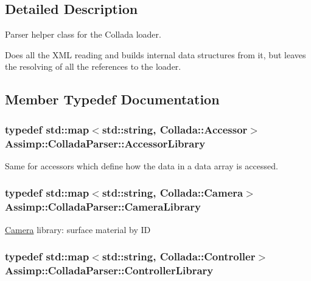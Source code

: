 \subsection{Detailed Description}
Parser helper class for the Collada loader.

Does all the X\+M\+L reading and builds internal data structures from it, but leaves the resolving of all the references to the loader. 

\subsection{Member Typedef Documentation}
\hypertarget{class_assimp_1_1_collada_parser_ae9cc736118cecbbebb1117247aa83ff7}{
\subsubsection[{Accessor\+Library}]{\setlength{\rightskip}{0pt plus 5cm}typedef std\+::map$<$std\+::string, {\bf Collada\+::\+Accessor}$>$ {\bf Assimp\+::\+Collada\+Parser\+::\+Accessor\+Library}\hspace{0.3cm}{\ttfamily [protected]}}}\label{class_assimp_1_1_collada_parser_ae9cc736118cecbbebb1117247aa83ff7}
Same for accessors which define how the data in a data array is accessed. \hypertarget{class_assimp_1_1_collada_parser_a682434e214b9d9831166f0ac55b1aed4}{
\subsubsection[{Camera\+Library}]{\setlength{\rightskip}{0pt plus 5cm}typedef std\+::map$<$std\+::string, {\bf Collada\+::\+Camera}$>$ {\bf Assimp\+::\+Collada\+Parser\+::\+Camera\+Library}\hspace{0.3cm}{\ttfamily [protected]}}}\label{class_assimp_1_1_collada_parser_a682434e214b9d9831166f0ac55b1aed4}
\hyperlink{class_camera}{Camera} library\+: surface material by I\+D \hypertarget{class_assimp_1_1_collada_parser_a2e216f3a8cc9f2953967c5ae59bed7c9}{
\subsubsection[{Controller\+Library}]{\setlength{\rightskip}{0pt plus 5cm}typedef std\+::map$<$std\+::string, {\bf Collada\+::\+Controller}$>$ {\bf Assimp\+::\+Collada\+Parser\+::\+Controller\+Library}\hspace{0.3cm}{\ttfamily [protected]}}}\label{class_assimp_1_1_collada_parser_a2e216f3a8cc9f2953967c5ae59bed7c9}
